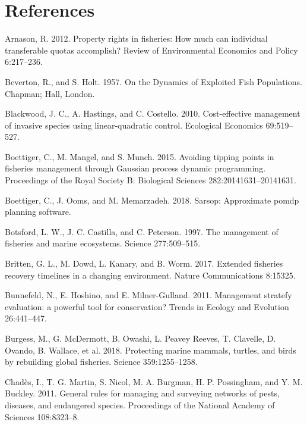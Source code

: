\documentclass[3p]{elsarticle} %
\begin{document}
\hypertarget{references}{%
\section*{References}\label{references}}

\hypertarget{refs}{}
\leavevmode\hypertarget{ref-Arnason2012}{}%
Arnason, R. 2012. Property rights in fisheries: How much can individual
transferable quotas accomplish? Review of Environmental Economics and
Policy 6:217--236.

\leavevmode\hypertarget{ref-Beverton1957}{}%
Beverton, R., and S. Holt. 1957. On the Dynamics of Exploited Fish
Populations. Chapman; Hall, London.

\leavevmode\hypertarget{ref-Blackwood2010}{}%
Blackwood, J. C., A. Hastings, and C. Costello. 2010. Cost-effective
management of invasive species using linear-quadratic control.
Ecological Economics 69:519--527.

\leavevmode\hypertarget{ref-Boettiger2015}{}%
Boettiger, C., M. Mangel, and S. Munch. 2015. Avoiding tipping points in
fisheries management through Gaussian process dynamic programming.
Proceedings of the Royal Society B: Biological Sciences
282:20141631--20141631.

\leavevmode\hypertarget{ref-sarsop-pkg}{}%
Boettiger, C., J. Ooms, and M. Memarzadeh. 2018. Sarsop: Approximate
pomdp planning software.

\leavevmode\hypertarget{ref-Botsford1997}{}%
Botsford, L. W., J. C. Castilla, and C. Peterson. 1997. The management
of fisheries and marine ecosystems. Science 277:509--515.

\leavevmode\hypertarget{ref-Britten2017}{}%
Britten, G. L., M. Dowd, L. Kanary, and B. Worm. 2017. Extended
fisheries recovery timelines in a changing environment. Nature
Communications 8:15325.

\leavevmode\hypertarget{ref-Bunnefeld2011}{}%
Bunnefeld, N., E. Hoshino, and E. Milner-Gulland. 2011. Management
stratefy evaluation: a powerful tool for conservation? Trends in Ecology
and Evolution 26:441--447.

\leavevmode\hypertarget{ref-Burgess2018}{}%
Burgess, M., G. McDermott, B. Owashi, L. Peavey Reeves, T. Clavelle, D.
Ovando, B. Wallace, et al. 2018. Protecting marine mammals, turtles, and
birds by rebuilding global fisheries. Science 359:1255--1258.

\leavevmode\hypertarget{ref-Chades2011}{}%
Chadès, I., T. G. Martin, S. Nicol, M. A. Burgman, H. P. Possingham, and
Y. M. Buckley. 2011. General rules for managing and surveying networks
of pests, diseases, and endangered species. Proceedings of the National
Academy of Sciences 108:8323--8.
\end{document}
